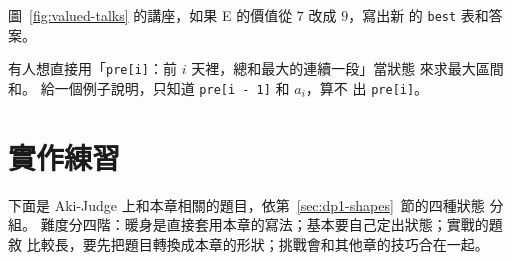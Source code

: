 \begin{drills}[label=drills:dp1]
\item 圖~\ref{fig:valued-talks} 的講座，如果 E 的價值從 $7$ 改成 $9$，寫出新
的 \texttt{best} 表和答案。

\item 有人想直接用「\texttt{pre[i]}：前 $i$ 天裡，總和最大的連續一段」當狀態
來求最大區間和。 給一個例子說明，只知道 \texttt{pre[i - 1]} 和 $a_i$，算不
出 \texttt{pre[i]}。
\end{drills}

\section{實作練習}
\label{sec:dp1-practice}

下面是 Aki-Judge 上和本章相關的題目，依第~\ref{sec:dp1-shapes}~節的四種狀態
分組。 難度分四階：暖身是直接套用本章的寫法；基本要自己定出狀態；實戰的題敘
比較長，要先把題目轉換成本章的形狀；挑戰會和其他章的技巧合在一起。

